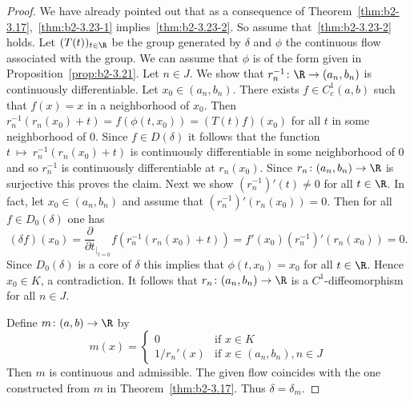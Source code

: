 \begin{proof}
We have already pointed out that as a consequence of Theorem~\ref{thm:b2-3.17},~\ref{thm:b2-3.23-1} implies~\ref{thm:b2-3.23-2}.
So assume that~\ref{thm:b2-3.23-2} holds.
Let $(T(t))_{t \in \R}$ be the group generated by $\delta$ and $\phi$ the continuous flow associated with the group.
We can assume that $\phi$ is of the form given in Proposition~\ref{prop:b2-3.21}.
Let $n \in J$.
We show that $r_{n}^{-1} \colon \R \to (a_{n},b_{n})$ is continuously differentiable.
Let $x_{0} \in (a_{n},b_{n})$.
There exists $f \in C_{c}^{1}(a,b)$ such that $f(x) = x$ in a neighborhood of\/ $x_{0}$.
Then $r_{n}^{-1}(r_{n}(x_{0}) + t) = f(\phi(t,x_{0})) = (T(t)f)(x_{0})$ for all $t$ in some neighborhood of\/ $0$.
Since $f \in D(\delta)$ it follows that the function $t~\mapsto~r_{n}^{-1}(r_{n}(x_{0}) + t)$ is continuously differentiable in some neighborhood of\/ $0$ and so $r_{n}^{-1}$ is continuously differentiable at $r_{n}(x_{0})$.
Since $r_{n} \colon (a_{n},b_{n}) \to \R$ is surjective this proves the claim.
Next we show $(r_{n}^{-1})'(t) \neq 0$ for all $t \in \R$.
In fact, let $x_{0} \in (a_{n},b_{n})$ and assume that $(r_{n}^{-1})'(r_{n}(x_{0})) = 0$.
Then for all $f \in D_{0}(\delta)$ one has 
\[
(\delta f)(x_{0}) = \frac{\partial}{\partial t}_{|_{t=0}} f(r_{n}^{-1}(r_{n}(x_{0}) + t)) = f'(x_{0})(r_{n}^{-1})'(r_{n}(x_{0})) = 0.
\]
Since $D_{0}(\delta)$ is a core of\/ $\delta$ this implies that $\phi(t,x_{0}) = x_{0}$ for all $t \in \R$.
Hence $x_{0} \in K$, a contradiction.
It follows that $r_{n} \colon (a_{n},b_{n}) \to \R$ is a $C^{1}$-diffeomorphism for all $n \in J$.

Define $m \colon (a,b) \to \R$ by
\begin{equation*}\label{eq:b2-m-def}
m(x) = \begin{cases}
    0 & \text{if } x \in K \\
    1/r_{n}'(x) & \text{if } x \in (a_{n},b_{n}), n \in J
\end{cases}
\end{equation*}
Then $m$ is continuous and admissible.
The given flow coincides with the one constructed from $m$ in Theorem~\ref{thm:b2-3.17}.
Thus $\delta = \delta_{m}$.
\end{proof}

